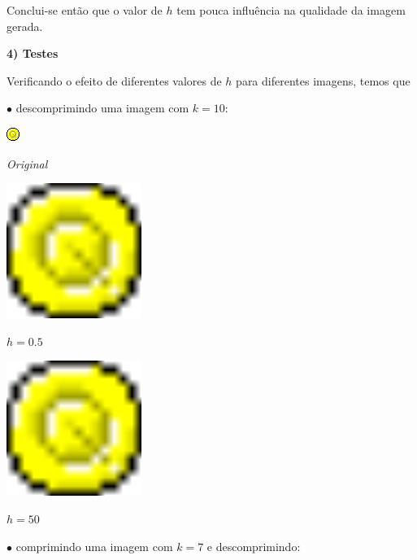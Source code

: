\documentclass{article}
\begin{document}
\quad Conclui-se então que o valor de $h$ tem pouca influência na qualidade da imagem gerada.

\bigskip
\textbf{\Large{4) Testes}}

\quad Verificando o efeito de diferentes valores de $h$ para diferentes imagens, temos que

\qquad $\bullet$ descomprimindo uma imagem com $k = 10$:

\bigskip

\begin{center}
\includegraphics{quesha.png}

\emph{Original}

\bigskip
\includegraphics{quesha05.png}

\emph{$h = 0.5$}

\bigskip
\includegraphics{quesha50.png}

\emph{$h = 50$}
\end{center}

\newpage
\qquad $\bullet$ comprimindo uma imagem com $k = 7$ e descomprimindo:
\end{document}

